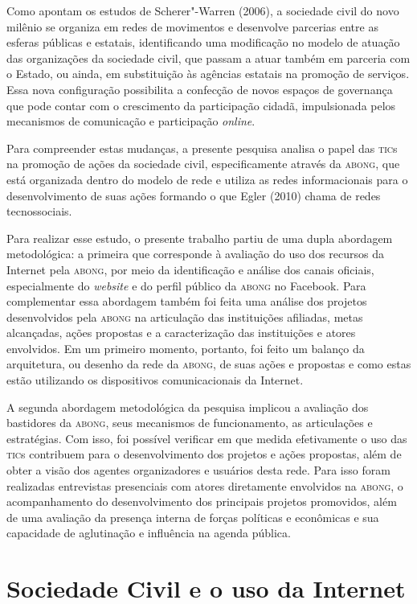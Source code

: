 Como apontam os estudos de Scherer"-Warren (2006), a sociedade civil do
novo milênio se organiza em redes de movimentos e desenvolve parcerias
entre as esferas públicas e estatais, identificando uma modificação no
modelo de atuação das organizações da sociedade civil, que passam a
atuar também em parceria com o Estado, ou ainda, em substituição às
agências estatais na promoção de serviços. Essa nova configuração
possibilita a confecção de novos espaços de governança que pode contar
com o crescimento da participação cidadã, impulsionada pelos mecanismos
de comunicação e participação \textit{online}.

Para compreender estas mudanças, a presente pesquisa analisa o papel das
\textsc{tic}s na promoção de ações da sociedade civil, especificamente através da
\textsc{abong}, que está organizada dentro do
modelo de rede e utiliza as redes informacionais para o desenvolvimento
de suas ações formando o que Egler (2010) chama de redes tecnossociais.

Para realizar esse estudo, o presente trabalho partiu de uma dupla
abordagem metodológica: a primeira que corresponde à avaliação do uso
dos recursos da Internet pela \textsc{abong}, por meio da identificação e análise
dos canais oficiais, especialmente do \textit{website} e do perfil público da
\textsc{abong} no Facebook. Para complementar essa abordagem também foi feita uma
análise dos projetos desenvolvidos pela \textsc{abong} na articulação das
instituições afiliadas, metas alcançadas, ações propostas e a
caracterização das instituições e atores envolvidos. Em um primeiro
momento, portanto, foi feito um balanço da arquitetura, ou desenho da
rede da \textsc{abong}, de suas ações e propostas e como estas estão utilizando
os dispositivos comunicacionais da Internet.

A segunda abordagem metodológica da pesquisa implicou a avaliação dos
bastidores da \textsc{abong}, seus mecanismos de funcionamento, as articulações e
estratégias. Com isso, foi possível verificar em que medida efetivamente
o uso das \textsc{tic}s contribuem para o desenvolvimento dos projetos e ações
propostas, além de obter a visão dos agentes organizadores e usuários
desta rede. Para isso foram realizadas entrevistas presenciais com
atores diretamente envolvidos na \textsc{abong}, o acompanhamento do
desenvolvimento dos principais projetos promovidos, além de uma
avaliação da presença interna de forças políticas e econômicas e sua
capacidade de aglutinação e influência na agenda pública.

\section{Sociedade Civil e o uso da Internet}

